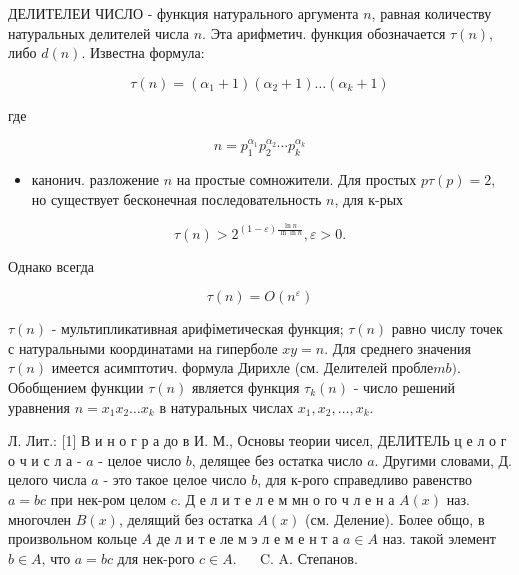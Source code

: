 \documentclass[10pt]{article}
\begin{document}
ДЕЛИТЕЛЕИ ЧИСЛО - функция натурального аргумента $n$, равная количеству натуральных делителей числа $n$. Эта арифметич. функция обозначается $\tau(n)$, либо $d(n)$. Известна формула:



\[

\tau(n)=\left(\alpha_{1}+1\right)\left(\alpha_{2}+1\right) \ldots\left(\alpha_{k}+1\right)

\]



где



\[

n=p_{1}^{\alpha_{1}} p_{2}^{\alpha_{2}} \cdots p_{k}^{\alpha_{k}}

\]



\begin{itemize}

  \item канонич. разложение $n$ на простые сомножители. Для простых $p \tau(p)=2$, но существует бесконечная последовательность $n$, для к-рых

\end{itemize}



\[

\tau(n)>2^{(1-\varepsilon) \frac{\ln n}{\ln \ln n}}, \varepsilon>0 .

\]



Однако всегда



\[

\tau(n)=O\left(n^{\varepsilon}\right)

\]



$\tau(n)$ - мультипликативная арифіметическая функция; $\tau(n)$ равно числу точек с натуральными координатами на гиперболе $x y=n$. Для среднего значения $\tau(n)$ имеется асимптотич. формула Дирихле (см. Делителей пробле$m b)$. Обобщением функции $\tau(n)$ является функция $\tau_{k}(n)$ - число решений уравнения $n=x_{1} x_{2} \ldots x_{k}$ в натуральных числах $x_{1}, x_{2}, \ldots, x_{k}$.



Л. Лит.: [1] В и н о г р а до в И. М., Основы теории чисел, ДЕЛИТЕЛЬ ц $е$ л о г о ч и с л $а$ - $a$ - целое число $b$, делящее без остатка число $a$. Другими словами, Д. целого числа $a$ - это такое целое число $b$, для к-рого справедливо равенство $a=b c$ при нек-ром целом $c$. Д е л и т е л е м мн о го ч л е н а $A(x)$ наз. многочлен $B(x)$, делящий без остатка $A(x)$ (см. Деление). Более общо, в произвольном кольце $A$ де л и т е ле м э л е м е н т а $a \in A$ наз. такой элемент $b \in A$, что $a=b c$ для нек-рого $c \in A$. $\quad$ C. A. Степанов.
\end{document}
